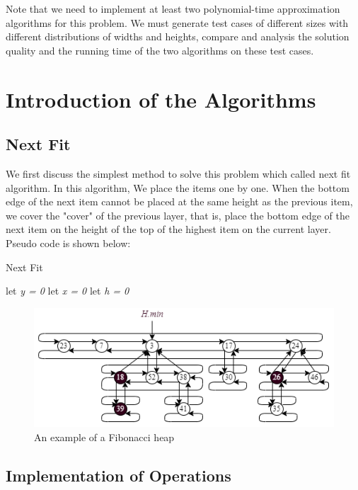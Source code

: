 \documentclass[12pt]{article}
\begin{document}
    Note that we need to implement at least two polynomial-time approximation algorithms for this problem.
    We must generate test cases of different sizes with different distributions of widths and heights,
    compare and analysis the solution quality and the running time of the two algorithms on these test cases. 

    \section{Introduction of the Algorithms}
    \subsection{Next Fit}
    We first discuss the simplest method to solve this problem which called next fit algorithm.
    In this algorithm, We place the items one by one.
    When the bottom edge of the next item cannot be placed at the same height as the previous item,
    we cover the "cover" of the previous layer, that is,
    place the bottom edge of the next item on the height of the top of the highest item on the current layer.
    Pseudo code is shown below:
    \begin{algorithm}
        \caption{Next Fit}
        \LinesNumbered
        let \emph{y = 0}\;
        let \emph{x = 0}\;
        let \emph{h = 0}\;
    \end{algorithm}
    
    \begin{figure}[h]
        \centering
        \includegraphics[scale=0.7]{heap.png}
        \caption{An example of a Fibonacci heap}
    \end{figure}
    \subsection{Implementation of Operations}
\end{document}
